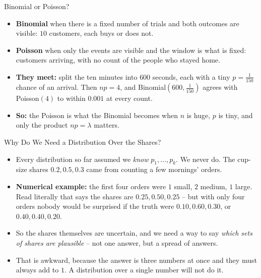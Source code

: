 \begin{frame}{Binomial or Poisson?}
\begin{itemize}
  \item \textbf{Binomial} when there is a fixed number of trials and both outcomes are visible: $10$ customers, each buys or does not.
  \pause
  \item \textbf{Poisson} when only the events are visible and the window is what is fixed: customers arriving, with no count of the people who stayed home.
  \pause
  \item \textbf{They meet:} split the ten minutes into $600$ seconds, each with a tiny $p = \tfrac{1}{150}$ chance of an arrival. Then $np = 4$, and Binomial$(600, \tfrac{1}{150})$ agrees with Poisson$(4)$ to within $0.001$ at every count.
  \pause
  \item \textbf{So:} the Poisson is what the Binomial becomes when $n$ is huge, $p$ is tiny, and only the product $np = \lambda$ matters.
\end{itemize}
\end{frame}

\begin{frame}{Why Do We Need a Distribution Over the Shares?}
\begin{itemize}
  \item Every distribution so far assumed we \emph{know} $p_1, \dots, p_k$. We never do. The cup-size shares $0.2, 0.5, 0.3$ came from counting a few mornings' orders.
  \pause
  \item \textbf{Numerical example:} the first four orders were $1$ small, $2$ medium, $1$ large. Read literally that says the shares are $0.25, 0.50, 0.25$ -- but with only four orders nobody would be surprised if the truth were $0.10, 0.60, 0.30$, or $0.40, 0.40, 0.20$.
  \pause
  \item So the shares themselves are uncertain, and we need a way to say \emph{which sets of shares are plausible} -- not one answer, but a spread of answers.
  \pause
  \item That is awkward, because the answer is three numbers at once and they must always add to $1$. A distribution over a single number will not do it.
\end{itemize}
\end{frame}

